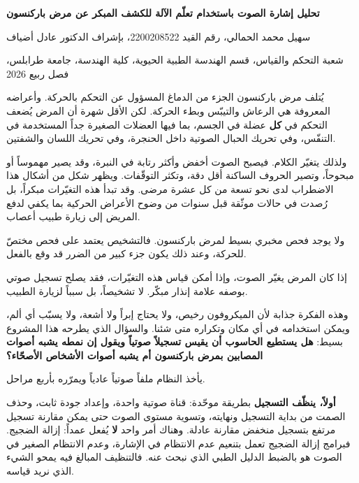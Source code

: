 \documentclass[11pt,a4paper]{report}
\newcommand{\shead}[1]{\par\vspace{7pt}\noindent{\large\textbf{#1}}\par\vspace{2pt}}
\begin{document}
\begin{Arabic}

\begin{center}
{\large \textbf{تحليل إشارة الصوت باستخدام تعلّم الآلة للكشف المبكر عن مرض باركنسون}}

\vspace{3pt}
{\small سهيل محمد الحمالي، رقم القيد \textenglish{2200208522}،
بإشراف الدكتور عادل أضياف

شعبة التحكم والقياس، قسم الهندسة الطبية الحيوية، كلية الهندسة، جامعة
طرابلس، فصل ربيع \textenglish{2026}}
\end{center}

\shead{1. المشكلة}
يُتلف مرض باركنسون الجزء من الدماغ المسؤول عن التحكم بالحركة. وأعراضه
المعروفة هي الرعاش والتيبّس وبطء الحركة. لكن الأقل شهرة أن المرض يُضعف
التحكم في \textbf{كل} عضلة في الجسم، بما فيها العضلات الصغيرة جداً
المستخدمة في التنفّس، وفي تحريك الحبال الصوتية داخل الحنجرة، وفي تحريك
اللسان والشفتين.

ولذلك يتغيّر الكلام. فيصبح الصوت أخفض وأكثر رتابة في النبرة، وقد يصير
مهموساً أو مبحوحاً، وتصير الحروف الساكنة أقل دقة، وتكثر التوقّفات.
ويظهر شكل من أشكال هذا الاضطراب لدى نحو تسعة من كل عشرة مرضى. وقد
تبدأ هذه التغيّرات مبكراً، بل رُصدت في حالات موثّقة قبل سنوات من وضوح
الأعراض الحركية بما يكفي لدفع المريض إلى زيارة طبيب أعصاب.

ولا يوجد فحص مخبري بسيط لمرض باركنسون. فالتشخيص يعتمد على فحص مختصّ
للحركة، وعند ذلك يكون جزء كبير من الضرر قد وقع بالفعل.

\shead{2. الفكرة}
إذا كان المرض يغيّر الصوت، وإذا أمكن قياس هذه التغيّرات، فقد يصلح
تسجيل صوتي بوصفه علامة إنذار مبكّر. لا تشخيصاً، بل سبباً لزيارة
الطبيب.

وهذه الفكرة جذابة لأن الميكروفون رخيص، ولا يحتاج إبراً ولا أشعة، ولا
يسبّب أي ألم، ويمكن استخدامه في أي مكان وتكراره متى شئنا. والسؤال الذي
يطرحه هذا المشروع بسيط: \textbf{هل يستطيع الحاسوب أن يقيس تسجيلاً
صوتياً ويقول إن نمطه يشبه أصوات المصابين بمرض باركنسون أم يشبه أصوات
الأشخاص الأصحّاء؟}

\shead{3. كيف يعمل النظام}
يأخذ النظام ملفاً صوتياً عادياً ويمرّره بأربع مراحل.

\textbf{أولاً، ينظّف التسجيل} بطريقة موحّدة: قناة صوتية واحدة، وإعداد
جودة ثابت، وحذف الصمت من بداية التسجيل ونهايته، وتسوية مستوى الصوت حتى
يمكن مقارنة تسجيل مرتفع بتسجيل منخفض مقارنة عادلة. وهناك أمر واحد
\textbf{لا} يُفعل عمداً: إزالة الضجيج. فبرامج إزالة الضجيج تعمل
بتنعيم عدم الانتظام في الإشارة، وعدم الانتظام الصغير في الصوت هو
بالضبط الدليل الطبي الذي نبحث عنه. فالتنظيف المبالغ فيه يمحو الشيء
الذي نريد قياسه.


\end{Arabic}
\end{document}
